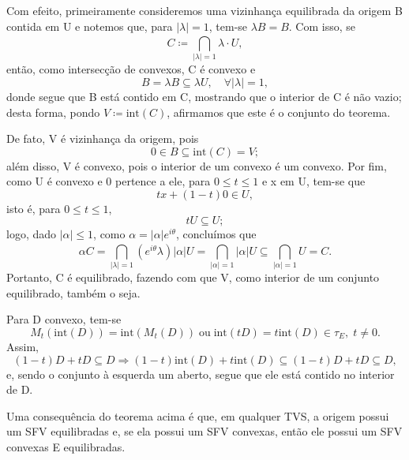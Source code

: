 \documentclass[../distribution_theory_notes.tex]{subfiles}
\begin{document}
\begin{proof*}
  Com efeito, primeiramente consideremos uma vizinhança equilibrada da origem B contida em U e notemos que, para \(|\lambda |=1\), tem-se \(\lambda B = B.\) Com isso, se 
    \[
      C\coloneqq \bigcap_{|\lambda |=1}^{}\lambda \cdot U,
    \]
    então, como intersecção de convexos, C é convexo e 
      \[
        B = \lambda B\subseteq \lambda U,\quad \forall |\lambda |=1,
      \] 
      donde segue que B está contido em C, mostrando que o interior de C é não vazio; desta forma, pondo \(V\coloneqq \mathrm{int}(C)\), afirmamos que este é o conjunto do teorema. 

      De fato, V é vizinhança da origem, pois 
        \[
          0\in B\subseteq \mathrm{int}(C)=V;
        \]
        além disso, V é convexo, pois o interior de um convexo é um convexo. Por fim, como U é convexo e 0 pertence a ele, para \(0\leq t\leq 1\) e x em U, tem-se que 
          \[
            tx + (1-t)0\in U,
          \]
          isto é, para \(0\leq t\leq 1\), 
            \[
              tU\subseteq U;
            \]
            logo, dado \(|\alpha |\leq 1\), como \(\alpha =|\alpha |e^{i\theta }\), concluímos que 
              \[
                \alpha C = \bigcap_{|\lambda |=1}^{}(e^{i\theta }\lambda )|\alpha |U = \bigcap_{|\alpha |=1}^{}|\alpha | U \subseteq \bigcap_{|\alpha |=1}^{}U = C.
              \]
              Portanto, C é equilibrado, fazendo com que V, como interior de um conjunto equilibrado, também o seja. \qedsymbol

\end{proof*}

  \begin{tcolorbox}[
  skin=enhanced,
  title=Lembrete!,
  after title={\hfill Interior de Convexo},
  fonttitle=\bfseries,
  sharp corners=downhill,
colframe=black,
  colbacktitle=yellow!75!white, 
  colback=yellow!30,
  colbacklower=black,
coltitle=black,
  drop large lifted shadow
  ]
  Para D convexo, tem-se 
    \[
      M_t(\mathrm{int}(D))=\mathrm{int}(M_t(D))\;\text{ou}\; \mathrm{int}(tD)=t \mathrm{int}(D)\in \tau_{E},\; t\neq 0.
    \] 
    Assim, 
      \[
        (1-t)D + tD\subseteq D \Rightarrow (1-t)\mathrm{int}(D)+t \mathrm{int}(D) \subseteq (1-t)D + tD \subseteq D,
      \]
      e, sendo o conjunto à esquerda um aberto, segue que ele está contido no interior de D.
  \end{tcolorbox}

  Uma consequência do teorema acima é que, em qualquer TVS, a origem possui um SFV equilibradas e, se ela possui um SFV convexas, então ele possui um SFV convexas E equilibradas.
\end{document}

